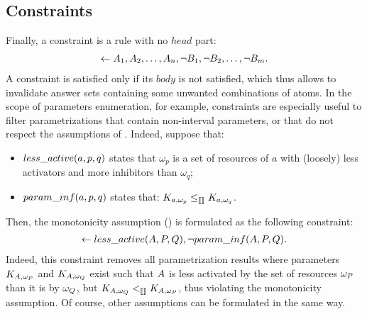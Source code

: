 \subsection{Constraints}\label{sssec:constraints}
Finally, a constraint is a rule with no $head$ part:
\begin{align*}
  \leftarrow A_1, A_2, \dots, A_n, \neg B_1, \neg B_2, \dots, \neg B_m.
\end{align*}
A constraint is satisfied only if its $body$ is not satisfied,
which thus allows to invalidate answer sets containing some unwanted combinations of atoms.
In the scope of parameters enumeration, for example, constraints are especially useful to filter parametrizations
that contain non-interval parameters, or that do not respect the assumptions of .
Indeed, suppose that:
\begin{itemize}
  \item $less\_active(a, p, q)$ states that $\omega_p$ is a set of resources of $a$ with (loosely) less activators and more inhibitors than $\omega_q$;
  \item $param\_inf(a, p, q)$ states that: $K_{a,\omega_p} \leq_{\llbracket\rrbracket} K_{a,\omega_q}$.
\end{itemize}
Then, the monotonicity assumption () is formulated as the following constraint:
\begin{align*}
  \leftarrow less\_active(A, P, Q), \neg param\_inf(A, P, Q).
\end{align*}
Indeed, this constraint removes all parametrization results where parameters $K_{A,\omega_P}$ and $K_{A,\omega_Q}$ exist
such that $A$ is less activated by the set of resources $\omega_P$ than it is by $\omega_Q$,
but $K_{A,\omega_Q} <_{\llbracket\rrbracket} K_{A,\omega_P}$,
thus violating the monotonicity assumption.
Of course, other assumptions can be formulated in the same way.

